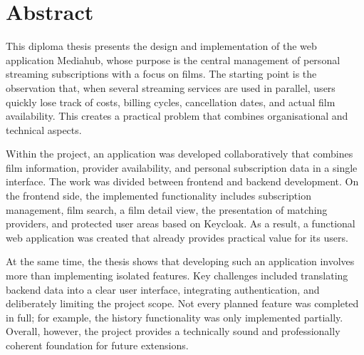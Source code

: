 \chapter*{Abstract}
This diploma thesis presents the design and implementation of the web application \glqq Mediahub\grqq{}, whose purpose is the central management of personal streaming subscriptions with a focus on films. The starting point is the observation that, when several streaming services are used in parallel, users quickly lose track of costs, billing cycles, cancellation dates, and actual film availability. This creates a practical problem that combines organisational and technical aspects.

Within the project, an application was developed collaboratively that combines film information, provider availability, and personal subscription data in a single interface. The work was divided between frontend and backend development. On the frontend side, the implemented functionality includes subscription management, film search, a film detail view, the presentation of matching providers, and protected user areas based on Keycloak. As a result, a functional web application was created that already provides practical value for its users.

At the same time, the thesis shows that developing such an application involves more than implementing isolated features. Key challenges included translating backend data into a clear user interface, integrating authentication, and deliberately limiting the project scope. Not every planned feature was completed in full; for example, the history functionality was only implemented partially. Overall, however, the project provides a technically sound and professionally coherent foundation for future extensions.
